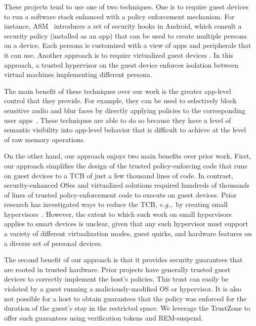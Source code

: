 \documentclass[pageno]{sig-alternate-05-2015}
\newcommand{\eg}{\textit{e.g.,}}
\begin{document}
These projects tend to use one of two techniques. One is to require guest
devices to run a software stack enhanced with a policy enforcement mechanism.
For instance, ASM~\cite{asm:sec14} introduces a set of security hooks in
Android, which consult a security policy (installed as an app) that can be used
to create multiple persona on a device. Each persona is customized with a view
of apps and peripherals that it can use. Another approach is to require
virtualized guest devices
\cite{cells:sosp11,cox:hotmobile07,vmwareverizon,kvmarm:asplos14}. In this
approach, a trusted hypervisor on the guest device enforces isolation between
virtual machines implementing different persona.

The main benefit of these techniques over our work is the greater app-level
control that they provide. For example, they can be used to selectively block
sensitive audio and blur faces by directly applying policies to the
corresponding user apps~\cite{worlddriven:ccs14,ar:sec13}. These techniques
are able to do so because they have a level of semantic visibility into
app-level behavior that is difficult to achieve at the level of raw memory
operations.

On the other hand, our approach enjoys two main benefits over prior work.
First, our approach simplifies the design of the trusted policy-enforcing code
that runs on guest devices to a TCB of just a few thousand lines of code. In
contrast, security-enhanced OSes and virtualized solutions required hundreds of
thousands of lines of trusted policy-enforcement code to execute on guest
devices.  Prior research has investigated ways to reduce the TCB, \eg~by
creating small hypervisors~\cite{nova:eurosys09}. However, the extent to which
such work on small hypervisors applies to smart devices is unclear, given that
any such hypervisor must support a variety of different virtualization modes,
guest quirks, and hardware features on a diverse set of personal devices.

The second benefit of our approach is that it provides security guarantees that
are rooted in trusted hardware. Prior projects have generally trusted guest
devices to correctly implement the host's policies. This trust can easily be
violated by a guest running a maliciously-modified OS or hypervisor.  It is
also not possible for a host to obtain guarantees that the policy was enforced
for the duration of the guest's stay in the restricted space. We leverage the
TrustZone to offer such guarantees using verification tokens and REM-suspend.
\end{document}
